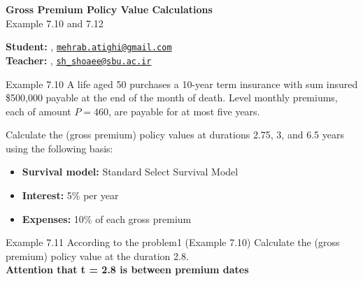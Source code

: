 


\usepackage{actuarialsymbol}


	\begin{Large}
		\textsf{\textbf{Gross Premium Policy Value Calculations}}\\
		Example 7.10 and 7.12
	\end{Large}
	
	\vspace{1ex}
	
	\textsf{\textbf{Student:}} , \href{mailto:mehrab.atighi@gmail.com}{\texttt{mehrab.atighi@gmail.com}}\\
	\textsf{\textbf{Teacher:}} , \href{mailto:sh_shoaee@sbu.ac.ir}{\texttt{sh\_shoaee@sbu.ac.ir}}
	
	\vspace{2ex}
	
	\begin{problem}{}{Example 7.10}
		A life aged 50 purchases a 10-year term insurance with sum insured \$500,000 payable at the end of the month of death. Level monthly premiums, each of amount $P = 460$, are payable for at most five years.
		
		Calculate the (gross premium) policy values at durations 2.75, 3, and 6.5 years using the following basis:
		\begin{itemize}
			\item \textbf{Survival model:} Standard Select Survival Model
			\item \textbf{Interest:} 5\% per year
			\item \textbf{Expenses:} 10\% of each gross premium
		\end{itemize}
	\end{problem}
	\begin{problem}{}{Example 7.11}
		According to the problem1 (Example 7.10) Calculate the (gross premium) policy value at the duration 2.8. \\
		\textbf{Attention that t = 2.8 is between premium dates }
	\end{problem}
	
